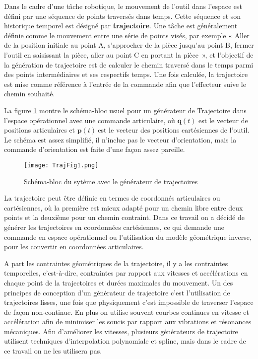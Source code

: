 
Dans le cadre d'une t\^{a}che robotique, le mouvement de l'outil dans l'espace est d\'{e}fini par une s\'{e}quence de points travers\'{e}s dans temps. Cette s\'{e}quence et son historique temporel est d\'{e}sign\'{e} par \textbf{trajectoire}. Une t\^{a}che est g\'{e}n\'{e}ralement d\'{e}finie comme le mouvement entre une s\'{e}rie de points vis\'{e}s, par exemple « Aller de la position initiale au point A, s'approcher de la pi\`{e}ce jusqu'au point B, fermer l'outil en saisissant la pi\`{e}ce, aller au point C en portant la pi\`{e}ce~», et l'objectif de la g\'{e}n\'{e}ration de trajectoire est de calculer le chemin travers\'{e} dans le temps parmi des points interm\'{e}diaires et ses respectifs temps. Une fois calcul\'{e}e, la trajectoire est mise comme r\'{e}f\'{e}rence \`{a} l'entr\'{e}e de la commande afin que l'effecteur suive le chemin souhait\'{e}.

La figure \ref{eller1} montre le sch\'{e}ma-bloc usuel pour un g\'{e}n\'{e}rateur de Trajectoire dans l'espace op\'{e}rationnel avec une commande articulaire, o\`{u} $\bm{q}(t)$ est le vecteur de positions articulaires et $\bm{p}(t)\ $est le vecteur des positions cart\'{e}siennes de l'outil. Le sch\'{e}ma est assez simplifi\'{e}, il n'inclue pas le vecteur d'orientation, mais la commande d'orientation est faite d'une fa\c{c}on assez pareille.
\\

\begin{figure}[H]	%
	\captionsetup{justification=centering,margin=1cm}
	\texttt{[image: TrajFig1.png]}
	\caption{Sch\'{e}ma-bloc du syt\`{e}me avec le g\'{e}n\'{e}rateur de trajectoires}
	\label{eller1}
\end{figure}


La trajectoire peut \^{e}tre d\'{e}finie en termes de coordonn\'{e}s articulaires ou cart\'{e}siennes, o\`{u} la premi\`{e}re est mieux adapt\'{e} pour un chemin libre entre deux points et la deuxi\`{e}me pour un chemin contraint. Dans ce travail on a d\'{e}cid\'{e} de g\'{e}n\'{e}rer les trajectoires en coordonn\'{e}es cart\'{e}siennes, ce qui demande une commande en espace op\'{e}rationnel ou l'utilisation du mod\`{e}le g\'{e}om\'{e}trique inverse, pour les convertir en coordonn\'{e}es articulaires. 

A part les contraintes g\'{e}om\'{e}triques de la trajectoire, il y a les contraintes temporelles, c'est-\`{a}-dire, contraintes par rapport aux vitesses et acc\'{e}l\'{e}rations en chaque point de la trajectoires et dur\'{e}es maximales du mouvement. Un des principes de conception d'un g\'{e}n\'{e}rateur de trajectoire c'est l'utilisation de trajectoires lisses, une fois que physiquement c'est impossible de traverser l'espace de fa\c{c}on non-continue. En plus on utilise souvent courbes continues en vitesse et acc\'{e}l\'{e}ration afin de minimiser les soucis par rapport aux vibrations et r\'{e}sonances m\'{e}caniques. Afin d'am\'{e}liorer les vitesses, plusieurs g\'{e}n\'{e}rateurs de trajectoire utilisent techniques d'interpolation polynomiale et spline, mais dans le cadre de ce travail on ne les utilisera pas.

